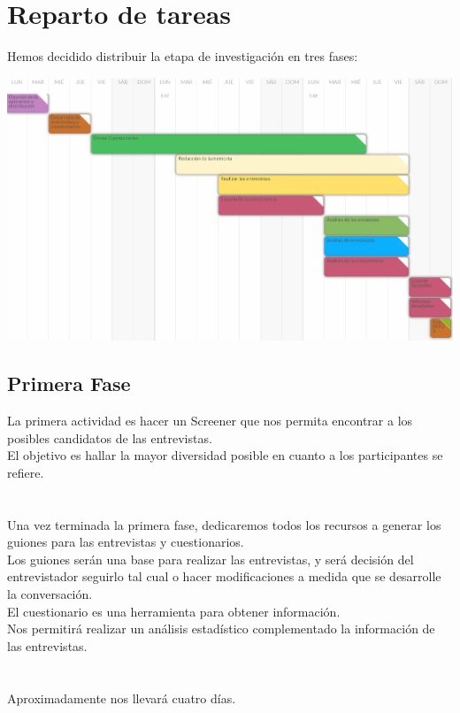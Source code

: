 \documentclass[12pt]{article}
\begin{document}
\section{Reparto de tareas}
Hemos decidido distribuir la etapa de investigación en tres fases:
\begin{center}
	\centering
	\includegraphics[width=1\textwidth]{planificacionHito1}
\end{center}
\subsection{Primera Fase}
La primera actividad es hacer un Screener que nos permita encontrar a los posibles candidatos de las entrevistas.\\ El objetivo es hallar la mayor diversidad posible en cuanto a los participantes se refiere.\\
\\
\\
	Una vez terminada la primera fase, dedicaremos todos los recursos a generar los guiones para las entrevistas y cuestionarios.\\ Los guiones serán una base para realizar las entrevistas, y será decisión del entrevistador seguirlo tal cual o hacer modificaciones a medida que se desarrolle la conversación.\\ El cuestionario es una herramienta para obtener información.\\ Nos permitirá realizar un análisis estadístico complementado la información de las entrevistas.\\ 
\\
\\
	Aproximadamente nos llevará cuatro días.\\
\end{document}
